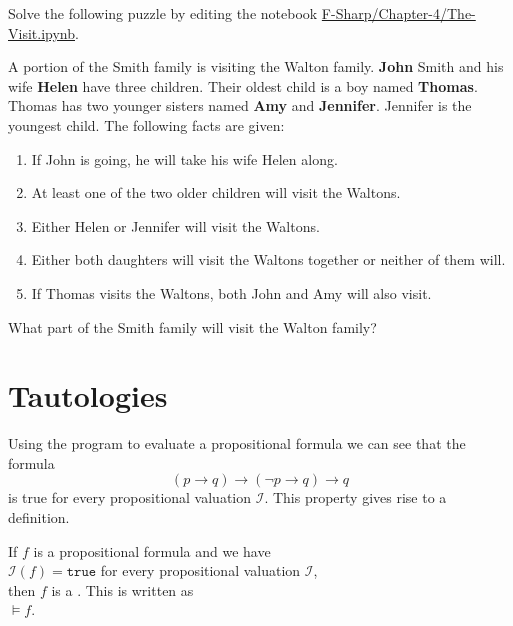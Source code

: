 \exerciseEng
Solve the following puzzle by editing the notebook \href{https://github.com/karlstroetmann/Logic/blob/master/F-Sharp/Chapter-4/The-Visit.ipynb}{F-Sharp/Chapter-4/The-Visit.ipynb}.

\begin{minipage}{0.95\linewidth}
  A portion of the Smith family is visiting the Walton family. \textbf{John} Smith and his wife \textbf{Helen} have three
  children. Their oldest child is a boy named \textbf{Thomas}. Thomas has two younger sisters named \textbf{Amy} and
  \textbf{Jennifer}. Jennifer is the youngest child. The following facts are given: 
  \begin{enumerate}
  \item If John is going, he will take his wife Helen along.
  \item At least one of the two older children will visit the Waltons.
  \item Either Helen or Jennifer will visit the Waltons.
  \item Either both daughters will visit the Waltons together or neither of them will.
  \item If Thomas visits the Waltons, both John and Amy will also visit.
  \end{enumerate}
What part of the Smith family will visit the Walton family?
\end{minipage}

\section{Tautologies}
Using the program to evaluate a propositional formula we can see that the formula
$$  (p \rightarrow q) \rightarrow (\neg p \rightarrow q) \rightarrow q $$
is true for every propositional valuation $\mathcal{I}$.  This property gives rise to a definition.

\begin{Definition}[Tautology]
  If $f$ is a propositional formula and we have  \\[0.2cm]
  \hspace{1.3cm} $\mathcal{I}(f) = \texttt{true}$ \quad for every propositional valuation $\mathcal{I}$, \\[0.2cm]
  then $f$ is a  .  This is written as \\[0.2cm]
  \hspace*{1.3cm} $\models f$.
  \eox
\end{Definition}

